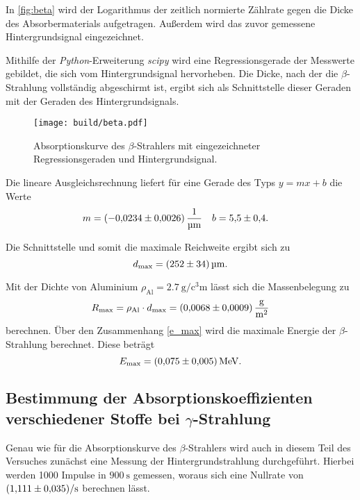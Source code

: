 In \autoref{fig:beta} wird der Logarithmus der zeitlich normierte Zählrate gegen die Dicke des Absorbermaterials 
aufgetragen. Außerdem wird das zuvor gemessene Hintergrundsignal eingezeichnet.

Mithilfe der \textit{Python}-Erweiterung \textit{scipy} \cite{scipy} wird eine Regressionsgerade der Messwerte gebildet, die sich
vom Hintergrundsignal hervorheben.
Die Dicke, nach der die $\beta$-Strahlung vollständig abgeschirmt ist, ergibt sich als Schnittstelle dieser Geraden mit der
Geraden des Hintergrundsignals.

\begin{figure}[H]
    \centering
    \texttt{[image: build/beta.pdf]}
    \caption{Absorptionskurve des $\beta$-Strahlers mit eingezeichneter Regressionsgeraden und Hintergrundsignal.}
    \label{fig:beta}
\end{figure}

Die lineare Ausgleichsrechnung liefert für eine Gerade des Typs $y = mx + b$ die Werte
\begin{align*}
    m &= \qty{-0.0234+-0.0026}{\per\micro\metre} & b &= \num{5.5+-0.4}.
\end{align*}

Die Schnittstelle und somit die maximale Reichweite ergibt sich zu
\begin{equation*}
    d_{\text{max}} = \qty{252+-34}{\micro\metre}.
\end{equation*}

Mit der Dichte von Aluminium $\rho_{\text{Al}} = \qty{2.7}{\gram\per\cubic\centi\metre}$ \cite{czichos} lässt sich die Massenbelegung
zu
\begin{equation*}
    R_{\text{max}} = \rho_{\text{Al}} \cdot d_{\text{max}} = \qty{0.0068+-0.0009}{\gram\per\metre\squared}
\end{equation*}
berechnen.
Über den Zusammenhang \eqref{e_max} wird die maximale Energie der $\beta$-Strahlung berechnet. Diese beträgt
\begin{equation*}
    E_{\text{max}} = \qty{0.075+-0.005}{\mega\electronvolt}.
\end{equation*}

\subsection{\texorpdfstring{Bestimmung der Absorptionskoeffizienten verschiedener Stoffe bei $\gamma$-Strahlung}
{Bestimmung der Absorptionskoeffizienten verschiedener Stoffe bei Gamma-Strahlung}}
Genau wie für die Absorptionskurve des $\beta$-Strahlers wird auch in diesem Teil des Versuches zunächst eine Messung
der Hintergrundstrahlung durchgeführt. Hierbei werden 1000 Impulse in $\qty{900}{\second}$ gemessen, woraus sich eine 
Nullrate von $\qty{1.111+-0.035}{\per\second}$ berechnen lässt.

